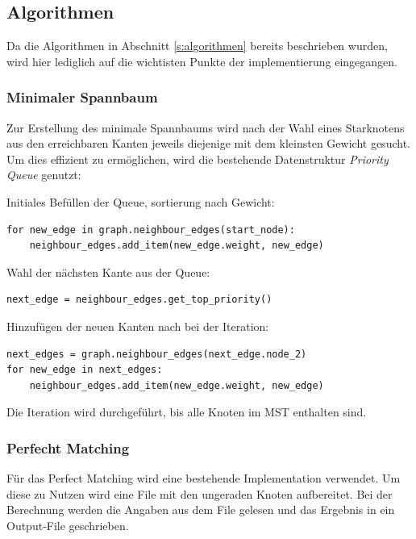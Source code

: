\documentclass[11pt,a4paper]{article}
\begin{document}
\subsection{Algorithmen}
Da die Algorithmen in Abschnitt \ref{s:algorithmen} bereits beschrieben wurden, wird hier lediglich auf die wichtisten Punkte der implementierung eingegangen.

\subsubsection{Minimaler Spannbaum}
Zur Erstellung des minimale Spannbaums wird nach der Wahl eines Starknotens aus den erreichbaren Kanten jeweils diejenige mit dem kleinsten Gewicht gesucht. Um dies effizient zu ermöglichen, wird die bestehende Datenstruktur \emph{Priority Queue} genutzt:

\begin{flushleft}
    Initiales Befüllen der Queue, sortierung nach Gewicht:
\end{flushleft}
\begin{verbatim}
for new_edge in graph.neighbour_edges(start_node):
    neighbour_edges.add_item(new_edge.weight, new_edge)
\end{verbatim}

\begin{flushleft}
    Wahl der nächsten Kante aus der Queue:
\end{flushleft}
\begin{verbatim}
next_edge = neighbour_edges.get_top_priority()
\end{verbatim}

\begin{flushleft}
    Hinzufügen der neuen Kanten nach bei der Iteration:
\end{flushleft}

\begin{verbatim}
next_edges = graph.neighbour_edges(next_edge.node_2)
for new_edge in next_edges:
    neighbour_edges.add_item(new_edge.weight, new_edge)
\end{verbatim}

Die Iteration wird durchgeführt, bis alle Knoten im MST enthalten sind.

\subsubsection{Perfecht Matching}
Für das Perfect Matching wird eine bestehende Implementation verwendet. Um diese zu Nutzen wird eine File mit den ungeraden Knoten aufbereitet. Bei der Berechnung werden die Angaben aus dem File gelesen und das Ergebnis in ein Output-File geschrieben.
\end{document}
